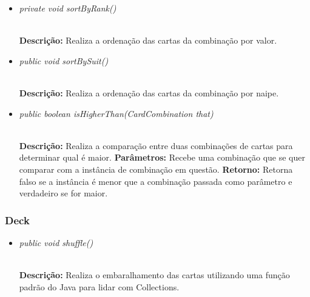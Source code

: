 \documentclass[12pt]{article}
\begin{document}
\vspace{0.2 true cm}

\begin{itemize}
\item \begin{large}\textit{private void sortByRank()}\end{large}\\
\subitem \textbf{Descrição:} Realiza a ordenação das cartas da combinação por valor.
\end{itemize}

\vspace{0.2 true cm}

\begin{itemize}
\item \begin{large}\textit{public void sortBySuit()}\end{large}\\
\subitem \textbf{Descrição:} Realiza a ordenação das cartas da combinação por naipe.
\end{itemize}

\vspace{0.2 true cm}

\begin{itemize}
\item \begin{large}\textit{public boolean isHigherThan(CardCombination that)}\end{large}\\
\subitem \textbf{Descrição:} Realiza a comparação entre duas combinações de cartas para determinar qual é maior.
\subitem \textbf{Parâmetros:} Recebe uma combinação que se quer comparar com a instância de combinação em questão.
\subitem \textbf{Retorno:} Retorna falso se a instância é menor que a combinação passada como parâmetro e verdadeiro se for maior.
\end{itemize}

\vspace{0.2 true cm}

\subsubsection{Deck}

\begin{itemize}
\item \begin{large}\textit{public void shuffle()}\end{large}\\
\subitem \textbf{Descrição:} Realiza o embaralhamento das cartas utilizando uma função padrão do Java para lidar com Collections.
\end{itemize}
\end{document}
